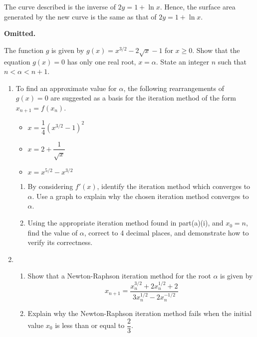 \documentclass{echw}
\begin{document}
            \noindent The curve described is the inverse of $2y = 1 + \ln x$. Hence, the surface area generated by the new curve is the same as that of $2y = 1 + \ln x$.


    \problem{}
        \textbf{Omitted.}

    \problem{}
        The function $g$ is given by $g(x) = x^{3/2} - 2\sqrt{x} - 1$ for $x \geq 0$. Show that the equation $g(x) = 0$ has only one real root, $x = \alpha$. State an integer $n$ such that $n < \alpha < n + 1$.

        \begin{enumerate}
            \item To find an approximate value for $\alpha$, the following rearrangements of $g(x) = 0$ are suggested as a basis for the iteration method of the form $x_{n+1} = f(x_n)$.
            \begin{itemize}
                \item $x = \dfrac14 \left(x^{3/2} - 1\right)^2$
                \item $x = 2 + \dfrac1{\sqrt{x}}$
                \item $x = x^{5/2} - x^{3/2}$
            \end{itemize}

            \begin{enumerate}
                \item By considering $f'(x)$, identify the iteration method which converges to $\alpha$. Use a graph to explain why the chosen iteration method converges to $\alpha$.
                \item Using the appropriate iteration method found in part(a)(i), and $x_0 = n$, find the value of $\alpha$, correct to 4 decimal places, and demonstrate how to verify its correctness.
            \end{enumerate}
            \item \begin{enumerate}
                \item Show that a Newton-Raphson iteration method for the root $\alpha$ is given by
                \begin{equation*}
                    x_{n+1} = \dfrac{x_n^{3/2} + 2x_n^{1/2} + 2}{3x_n^{1/2} - 2x_n^{-1/2}}
                \end{equation*}
                \item Explain why the Newton-Raphson iteration method fails when the initial value $x_0$ is less than or equal to $\dfrac23$.
            \end{enumerate}
        \end{enumerate}
\end{document}

